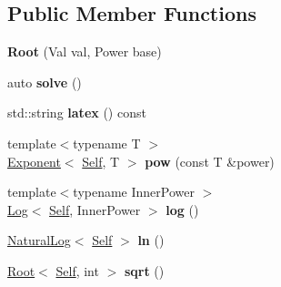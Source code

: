 \subsection*{Public Member Functions}
\begin{DoxyCompactItemize}
\item 
\hypertarget{classlatex_1_1math_1_1Root_a5457dc9b5582666b2bfaf2ea1342ec8a}{{\bfseries Root} (Val val, Power base)}\label{classlatex_1_1math_1_1Root_a5457dc9b5582666b2bfaf2ea1342ec8a}

\item 
\hypertarget{classlatex_1_1math_1_1Root_a97fe8f491bf5c90605d6f6aed7073a3a}{auto {\bfseries solve} ()}\label{classlatex_1_1math_1_1Root_a97fe8f491bf5c90605d6f6aed7073a3a}

\item 
\hypertarget{classlatex_1_1math_1_1Root_a7c2119b0146924a8388cbeaa72c4894d}{std\-::string {\bfseries latex} () const }\label{classlatex_1_1math_1_1Root_a7c2119b0146924a8388cbeaa72c4894d}

\item 
\hypertarget{classlatex_1_1math_1_1Root_a681826f8372d009b0cfd9acc335e19ae}{{\footnotesize template$<$typename T $>$ }\\\hyperlink{classlatex_1_1math_1_1Exponent}{Exponent}$<$ \hyperlink{classlatex_1_1math_1_1Root}{Self}, T $>$ {\bfseries pow} (const T \&power)}\label{classlatex_1_1math_1_1Root_a681826f8372d009b0cfd9acc335e19ae}

\item 
\hypertarget{classlatex_1_1math_1_1Root_aa278a24731fa57ed7e4d0615998398a0}{{\footnotesize template$<$typename Inner\-Power $>$ }\\\hyperlink{classlatex_1_1math_1_1Log}{Log}$<$ \hyperlink{classlatex_1_1math_1_1Root}{Self}, Inner\-Power $>$ {\bfseries log} ()}\label{classlatex_1_1math_1_1Root_aa278a24731fa57ed7e4d0615998398a0}

\item 
\hypertarget{classlatex_1_1math_1_1Root_aff88b4d579979681a8794881aab0646c}{\hyperlink{classlatex_1_1math_1_1NaturalLog}{Natural\-Log}$<$ \hyperlink{classlatex_1_1math_1_1Root}{Self} $>$ {\bfseries ln} ()}\label{classlatex_1_1math_1_1Root_aff88b4d579979681a8794881aab0646c}

\item 
\hypertarget{classlatex_1_1math_1_1Root_ab924cd8aa34a6284bd6b7b44610ec088}{\hyperlink{classlatex_1_1math_1_1Root}{Root}$<$ \hyperlink{classlatex_1_1math_1_1Root}{Self}, int $>$ {\bfseries sqrt} ()}\label{classlatex_1_1math_1_1Root_ab924cd8aa34a6284bd6b7b44610ec088}

\end{DoxyCompactItemize}
